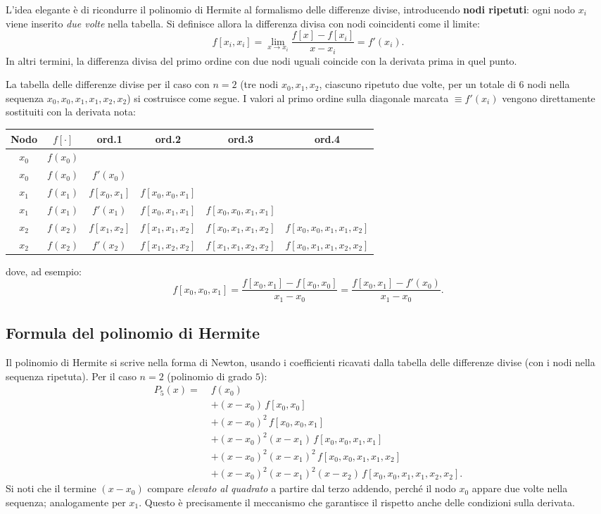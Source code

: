 \documentclass[a4paper,12pt]{article}
\theoremstyle{definition}
\theoremstyle{remark}
\begin{document}
L'idea elegante è di ricondurre il polinomio di Hermite al formalismo
delle differenze divise, introducendo \textbf{nodi ripetuti}: ogni nodo
$x_i$ viene inserito \emph{due volte} nella tabella. Si definisce
allora la differenza divisa con nodi coincidenti come il limite:
\[
  f[x_i, x_i] = \lim_{x \to x_i} \frac{f[x] - f[x_i]}{x - x_i} = f'(x_i).
\]
In altri termini, la differenza divisa del primo ordine con due nodi
uguali coincide con la derivata prima in quel punto.

La tabella delle differenze divise per il caso con $n=2$ (tre nodi
$x_0, x_1, x_2$, ciascuno ripetuto due volte, per un totale di $6$
nodi nella sequenza $x_0,x_0,x_1,x_1,x_2,x_2$) si costruisce come
segue. I valori al primo ordine sulla diagonale marcata $\equiv f'(x_i)$
vengono direttamente sostituiti con la derivata nota:

\medskip
\begin{center}
\begin{tabular}{c|c|cccc}
Nodo & $f[\cdot]$ & ord.1 & ord.2 & ord.3 & ord.4 \\
\hline
$x_0$ & $f(x_0)$ & & & & \\
$x_0$ & $f(x_0)$ & $f'(x_0)$ & & & \\
$x_1$ & $f(x_1)$ & $f[x_0,x_1]$ & $f[x_0,x_0,x_1]$ & & \\
$x_1$ & $f(x_1)$ & $f'(x_1)$ & $f[x_0,x_1,x_1]$ & $f[x_0,x_0,x_1,x_1]$ & \\
$x_2$ & $f(x_2)$ & $f[x_1,x_2]$ & $f[x_1,x_1,x_2]$ & $f[x_0,x_1,x_1,x_2]$ & $f[x_0,x_0,x_1,x_1,x_2]$ \\
$x_2$ & $f(x_2)$ & $f'(x_2)$ & $f[x_1,x_2,x_2]$ & $f[x_1,x_1,x_2,x_2]$ & $f[x_0,x_1,x_1,x_2,x_2]$
\end{tabular}
\end{center}
\medskip

\noindent dove, ad esempio:
\[
  f[x_0,x_0,x_1]
  = \frac{f[x_0,x_1] - f[x_0,x_0]}{x_1 - x_0}
  = \frac{f[x_0,x_1] - f'(x_0)}{x_1 - x_0}.
\]

\subsection{Formula del polinomio di Hermite}

Il polinomio di Hermite si scrive nella forma di Newton, usando i
coefficienti ricavati dalla tabella delle differenze divise (con i nodi
nella sequenza ripetuta). Per il caso $n=2$ (polinomio di grado $5$):
\begin{align*}
  P_5(x) =\;& f(x_0) \\
  &+ (x-x_0)\,f[x_0,x_0] \\
  &+ (x-x_0)^2\,f[x_0,x_0,x_1] \\
  &+ (x-x_0)^2(x-x_1)\,f[x_0,x_0,x_1,x_1] \\
  &+ (x-x_0)^2(x-x_1)^2\,f[x_0,x_0,x_1,x_1,x_2] \\
  &+ (x-x_0)^2(x-x_1)^2(x-x_2)\,f[x_0,x_0,x_1,x_1,x_2,x_2].
\end{align*}
Si noti che il termine $(x-x_0)$ compare \emph{elevato al quadrato}
a partire dal terzo addendo, perché il nodo $x_0$ appare due volte nella
sequenza; analogamente per $x_1$. Questo è precisamente il meccanismo
che garantisce il rispetto anche delle condizioni sulla derivata.
\end{document}

